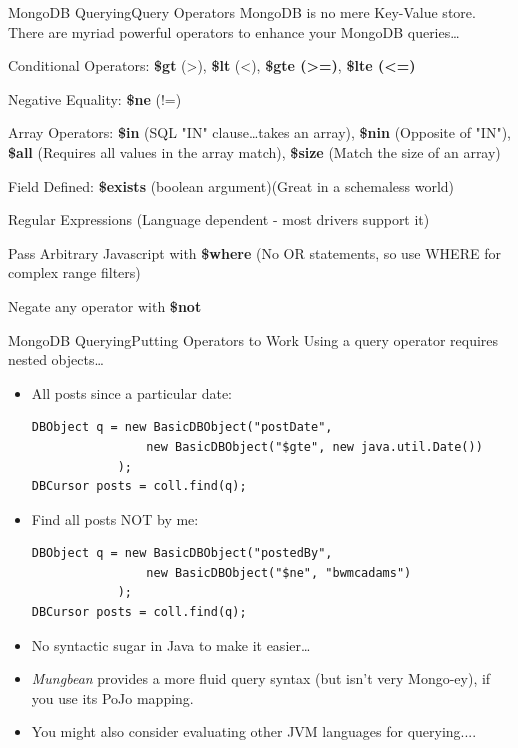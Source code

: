 \documentclass{beamer}
\begin{document}
\begin{frame}{MongoDB Querying}{Query Operators}
     MongoDB is no mere Key-Value store. There are myriad powerful operators to enhance your MongoDB queries\ldots
    \begin{itemize}{\small
        \item Conditional Operators: {\bf \$gt} (>), {\bf \$lt} (<), {\bf \$gte (>=)},  {\bf \$lte (<=)}
        \item Negative Equality: {\bf \$ne} (!=) 
        \item Array Operators: {\bf \$in} (SQL "IN" clause\ldots takes an array), {\bf \$nin} (Opposite of "IN"), {\bf \$all} (Requires all values in the array match), {\bf \$size} (Match the size of an array)
        \item Field Defined: {\bf \$exists} (boolean argument)(Great in a schemaless world)
        \item Regular Expressions (Language dependent - most drivers support it)
        \item Pass Arbitrary Javascript with {\bf \$where} (No OR statements, so use WHERE for complex range filters)
        \item Negate any operator with {\bf \$not}
        }
    \end{itemize}
\end{frame}

\begin{frame}[fragile]{MongoDB Querying}{Putting Operators to Work}
    Using a query operator requires nested objects\ldots
    \begin{itemize}
        \item<2-> All posts since a particular date:\\ \begin{lstlisting}
DBObject q = new BasicDBObject("postDate", 
                new BasicDBObject("$gte", new java.util.Date())
            ); 
DBCursor posts = coll.find(q);
\end{lstlisting}
        \item<3-> Find all posts NOT by me:\\ \begin{lstlisting}
DBObject q = new BasicDBObject("postedBy", 
                new BasicDBObject("$ne", "bwmcadams")
            );
DBCursor posts = coll.find(q);
\end{lstlisting}
        \item<4-> No syntactic sugar in Java to make it easier\ldots
        \item<5-> {\em Mungbean} provides a more fluid query syntax (but isn't very Mongo-ey), if you use its PoJo mapping.
        \item<6-> You might also consider evaluating other JVM languages for querying....

    \end{itemize}
\end{frame}
\end{document}
